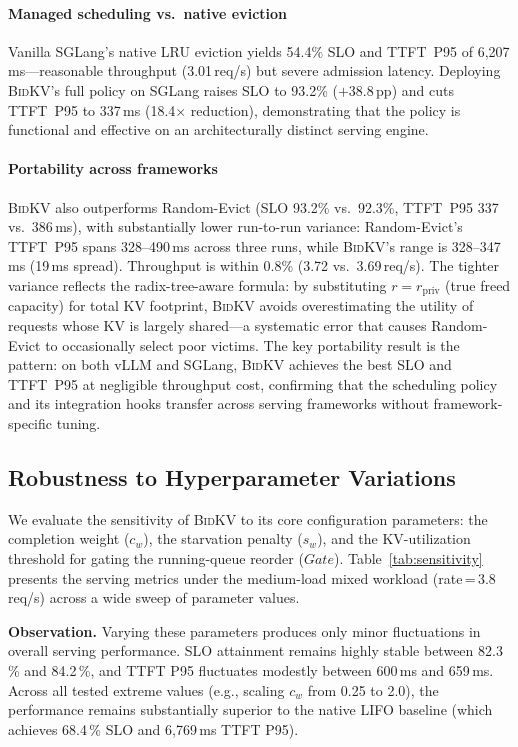 \documentclass[conference]{IEEEtran}
\newcommand{\bidkv}{\textsc{BidKV}\xspace}
\newcommand{\tokfree}{\ensuremath{r}}
\begin{document}
\paragraph{Managed scheduling vs.~native eviction}
Vanilla SGLang's native LRU eviction yields 54.4\% SLO and
TTFT~P95 of 6{,}207\,ms---reasonable throughput (3.01\,req/s) but severe
admission latency.  Deploying \bidkv's full policy on SGLang raises SLO to
93.2\% ($+$38.8\,pp) and cuts TTFT~P95 to 337\,ms (18.4$\times$ reduction),
demonstrating that the policy is functional and effective on an
architecturally distinct serving engine.

\paragraph{Portability across frameworks}
\bidkv also outperforms Random-Evict (SLO 93.2\% vs.~92.3\%, TTFT~P95
337 vs.~386\,ms), with substantially lower run-to-run variance:
Random-Evict's TTFT~P95 spans 328--490\,ms across three runs, while
\bidkv's range is 328--347\,ms (19\,ms spread).
Throughput is within 0.8\% (3.72 vs.~3.69\,req/s).
The tighter variance reflects the radix-tree-aware formula: by substituting
$\tokfree = r_{\mathrm{priv}}$ (true freed capacity) for total KV
footprint, \bidkv avoids overestimating the utility of requests whose KV
is largely shared---a systematic error that causes Random-Evict to
occasionally select poor victims.
The key portability result is the pattern: on both vLLM and SGLang,
\bidkv achieves the best SLO and TTFT~P95 at negligible throughput cost,
confirming that the scheduling policy and its integration hooks transfer
across serving frameworks without framework-specific tuning.

\subsection{Robustness to Hyperparameter Variations}
\label{sec:eval:robustness}

We evaluate the sensitivity of \bidkv to its core configuration parameters: the completion weight ($c_w$), the starvation penalty ($s_w$), and the KV-utilization threshold for gating the running-queue reorder ($Gate$). Table~\ref{tab:sensitivity} presents the serving metrics under the medium-load mixed workload (rate\,=\,3.8\,req/s) across a wide sweep of parameter values.

\textbf{Observation.} Varying these parameters produces only minor fluctuations in overall serving performance. SLO attainment remains highly stable between 82.3\,\% and 84.2\,\%, and TTFT P95 fluctuates modestly between 600\,ms and 659\,ms. Across all tested extreme values (e.g., scaling $c_w$ from 0.25 to 2.0), the performance remains substantially superior to the native LIFO baseline (which achieves 68.4\,\% SLO and 6{,}769\,ms TTFT P95).
\end{document}

